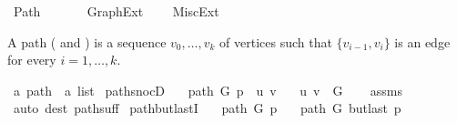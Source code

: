 %
\begin{isabellebody}%
%
%
\isadelimtheory
%
\endisadelimtheory
%
\isatagtheory
{}\isamarkupfalse%
\ Path\isanewline
\ \ \isanewline
\ \ \ \ Graph{\isacharunderscore}{\kern0pt}Ext\isanewline
\ \ \ \ {\isachardoublequoteopen}{\isachardot}{\kern0pt}{\isachardot}{\kern0pt}{\isacharslash}{\kern0pt}{\isachardot}{\kern0pt}{\isachardot}{\kern0pt}{\isacharslash}{\kern0pt}Misc{\isacharunderscore}{\kern0pt}Ext{\isachardoublequoteclose}\isanewline
{}%
\endisatagtheory
{\isafoldtheory}%
%
\isadelimtheory
%
\endisadelimtheory
%
\begin{isamarkuptext}%
A path ( and ) is a sequence $v_0,\dots,v_k$ of vertices such that
$\{v_{i-1},v_i\}$ is an edge for every $i=1,\dots,k$.%
\end{isamarkuptext}\isamarkuptrue%
\isamarkupfalse%
\ {\isacharprime}{\kern0pt}a\ path\ {\isacharequal}{\kern0pt}\ {\isachardoublequoteopen}{\isacharprime}{\kern0pt}a\ list{\isachardoublequoteclose}\isanewline
%
\isadeliminvisible
\isanewline
%
\endisadeliminvisible
%
\isataginvisible
{}\isamarkupfalse%
\ path{\isacharunderscore}{\kern0pt}snocD{\isacharcolon}{\kern0pt}\isanewline
\ \ \ {\isachardoublequoteopen}path\ G\ {\isacharparenleft}{\kern0pt}p\ {\isacharat}{\kern0pt}\ {\isacharbrackleft}{\kern0pt}u{\isacharcomma}{\kern0pt}\ v{\isacharbrackright}{\kern0pt}{\isacharparenright}{\kern0pt}{\isachardoublequoteclose}\isanewline
\ \ \ {\isachardoublequoteopen}{\isacharbraceleft}{\kern0pt}u{\isacharcomma}{\kern0pt}\ v{\isacharbraceright}{\kern0pt}\ {\isasymin}\ G{\isachardoublequoteclose}%
\endisataginvisible
{\isafoldinvisible}%
%
\isadeliminvisible
\isanewline
%
\endisadeliminvisible
%
\isadelimproof
\ \ %
\endisadelimproof
%
\isatagproof
{}\isamarkupfalse%
\ assms\isanewline
\ \ \isamarkupfalse%
\ {\isacharparenleft}{\kern0pt}auto\ dest{\isacharcolon}{\kern0pt}\ path{\isacharunderscore}{\kern0pt}suff{\isacharparenright}{\kern0pt}%
\endisatagproof
{\isafoldproof}%
%
\isadelimproof
\isanewline
%
\endisadelimproof
%
\isadeliminvisible
\isanewline
%
\endisadeliminvisible
%
\isataginvisible
{}\isamarkupfalse%
\ path{\isacharunderscore}{\kern0pt}butlastI{\isacharcolon}{\kern0pt}\isanewline
\ \ \ {\isachardoublequoteopen}path\ G\ p{\isachardoublequoteclose}\isanewline
\ \ \ {\isachardoublequoteopen}path\ G\ {\isacharparenleft}{\kern0pt}butlast\ p{\isacharparenright}{\kern0pt}{\isachardoublequoteclose}%

\end{isabellebody}
